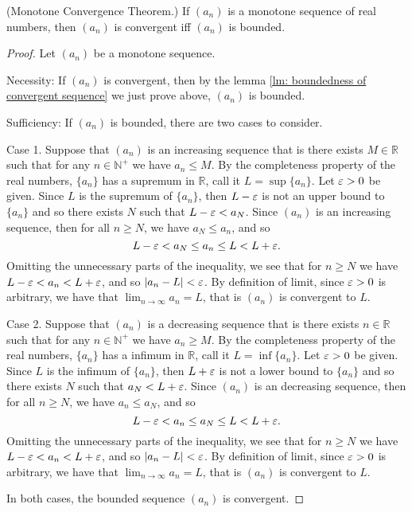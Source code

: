\documentclass[10pt]{article}
\begin{document}
	\begin{lemma} \label{lm: monotone convergence theorem}
		(Monotone Convergence Theorem.) If $(a_n)$ is a monotone sequence of real numbers, then $(a_n)$ is convergent iff $(a_n)$ is bounded.
	\end{lemma}
	\begin{proof}
		Let $(a_n)$ be a monotone sequence.

		Necessity: If $(a_n)$ is convergent, then by the lemma \ref{lm: boundedness of convergent sequence} we just prove above, $(a_n)$ is bounded.

		Sufficiency: If $(a_n)$ is bounded, there are two cases to consider.

		Case 1. Suppose that $(a_n)$ is an increasing sequence that is there exists $M \in \mathbb{R}$ such that for any $n \in \mathbb{N}^+$ we have $a_n \le M$. By the completeness property of the real numbers, $\{a_n\}$ has a supremum in $\mathbb{R}$, call it $L = \sup\{ a_n \}$. Let $\varepsilon > 0$ be given. Since $L$ is the supremum of $\{ a_n \}$, then $L - \varepsilon$ is not an upper bound to $\{ a_n \}$ and so there exists $N$ such that $L - \varepsilon < a_N$. Since $(a_n)$ is an increasing sequence, then for all $n \ge N$, we have $a_N \le a_n$, and so
		\begin{equation}
			L - \varepsilon < a_N \le a_n \le L < L + \varepsilon.
		\end{equation}
		Omitting the unnecessary parts of the inequality, we see that for $n \ge N$ we have $L-\varepsilon < a_n < L+ \varepsilon$, and so $\abs{a_n - L} < \varepsilon$. By definition of limit, since $\varepsilon > 0$ is arbitrary, we have that $\lim_{n \to \infty} a_n = L$, that is $(a_n)$ is convergent to $L$.

		Case 2. Suppose that $(a_n)$ is a decreasing sequence that is there exists $n \in \mathbb{R}$ such that for any $n \in \mathbb{N}^+$ we have $a_n \ge M$. By the completeness property of the real numbers, $\{a_n\}$ has a infimum in $\mathbb{R}$, call it $L = \inf\{ a_n \}$. Let $\varepsilon > 0$ be given. Since $L$ is the infimum of $\{ a_n \}$, then $L + \varepsilon$ is not a lower bound to $\{ a_n \}$ and so there exists $N$ such that $a_N < L + \varepsilon$. Since $(a_n)$ is an decreasing sequence, then for all $n \ge N$, we have $a_n \le a_N$, and so
		\begin{equation}
			L - \varepsilon < a_n \le a_N \le L < L + \varepsilon.
		\end{equation}
		Omitting the unnecessary parts of the inequality, we see that for $n \ge N$ we have $L-\varepsilon < a_n < L+ \varepsilon$, and so $\abs{a_n - L} < \varepsilon$. By definition of limit, since $\varepsilon > 0$ is arbitrary, we have that $\lim_{n \to \infty} a_n = L$, that is $(a_n)$ is convergent to $L$.

		In both cases, the bounded sequence $(a_n)$ is convergent.
	\end{proof}
\end{document}

